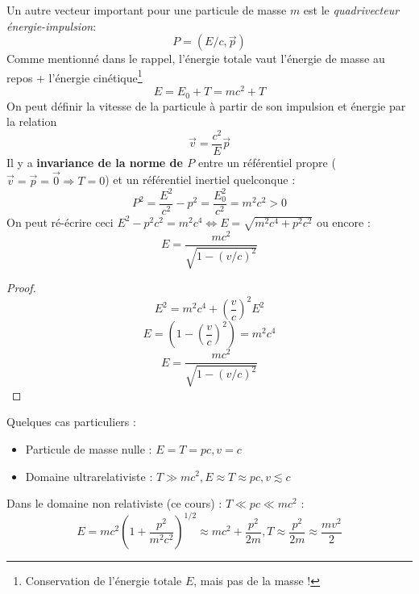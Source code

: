 \documentclass	[11pt, a4paper, openany]{book}
\begin{document}
Un autre vecteur important pour une particule de masse $m$ est le \textit{quadrivecteur énergie-impulsion}:
\begin{equation}
P = (E/c, \vec{p})
\end{equation}
Comme mentionné dans le rappel, l'énergie totale vaut l'énergie de masse au repos + l'énergie cinétique\footnote{Conservation de l'énergie totale $E$, mais pas de la masse !}
\begin{equation}
E = E_0 + T = mc^2 + T
\end{equation}
On peut définir la vitesse de la particule à partir de son impulsion et énergie par la relation
\begin{equation}
\vec{v} = \frac{c^2}{E}\vec{p}
\end{equation}
Il y a \textbf{invariance de la norme de $P$} entre un référentiel propre ($\vec v = \vec{p} = \vec 0\Rightarrow T = 0$) et un référentiel inertiel quelconque :
\begin{equation}
P^2 = \frac{E^2}{c^2} - p^2 = \frac{E_0^2}{c^2} = m^2c^2 > 0
\end{equation}
On peut ré-écrire ceci $E^2 - p^2c^2 = m^2c^4 \Leftrightarrow E = \sqrt{m^2c^4 + p^2c^2}$ ou encore :
\begin{equation}
E = \frac{mc^2}{\sqrt{1 - (v/c)^2}}
\end{equation}
\begin{proof}
\begin{equation}
E^2=m^2c^4+\left(\frac{v}{c}\right)^2E^2
\end{equation}
\begin{equation}
E = \left(1-\left(\frac{v}{c}\right)^2\right) = m^2c^4
\end{equation}
\begin{equation}
E = \frac{mc^2}{\sqrt{1 - (v/c)^2}}
\end{equation}
\end{proof}
Quelques cas particuliers :
\begin{itemize}
\item Particule de masse nulle : $E = T = pc, v=c$
\item Domaine ultrarelativiste : $T \gg mc^2, E \approx T \approx pc, v \lesssim c$
\end{itemize}
Dans le domaine non relativiste (ce cours) : $T \ll pc \ll mc^2$ :
\begin{equation}
E = mc^2\left(1+\frac{p^2}{m^2c^2}\right)^{1/2} \approx mc^2 + \frac{p^2}{2m}, T \approx \frac{p^2}{2m} \approx \frac{mv^2}{2}
\end{equation}
\end{document}

